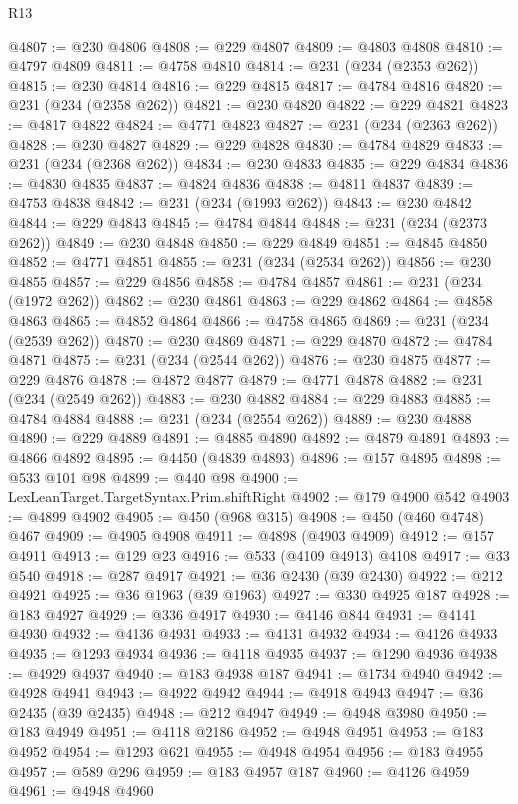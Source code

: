\begin{lexlean}{R13}
\begin{coremodule}
@4807 := @230 @4806
@4808 := @229 @4807
@4809 := @4803 @4808
@4810 := @4797 @4809
@4811 := @4758 @4810
@4814 := @231 (@234 (@2353 @262))
@4815 := @230 @4814
@4816 := @229 @4815
@4817 := @4784 @4816
@4820 := @231 (@234 (@2358 @262))
@4821 := @230 @4820
@4822 := @229 @4821
@4823 := @4817 @4822
@4824 := @4771 @4823
@4827 := @231 (@234 (@2363 @262))
@4828 := @230 @4827
@4829 := @229 @4828
@4830 := @4784 @4829
@4833 := @231 (@234 (@2368 @262))
@4834 := @230 @4833
@4835 := @229 @4834
@4836 := @4830 @4835
@4837 := @4824 @4836
@4838 := @4811 @4837
@4839 := @4753 @4838
@4842 := @231 (@234 (@1993 @262))
@4843 := @230 @4842
@4844 := @229 @4843
@4845 := @4784 @4844
@4848 := @231 (@234 (@2373 @262))
@4849 := @230 @4848
@4850 := @229 @4849
@4851 := @4845 @4850
@4852 := @4771 @4851
@4855 := @231 (@234 (@2534 @262))
@4856 := @230 @4855
@4857 := @229 @4856
@4858 := @4784 @4857
@4861 := @231 (@234 (@1972 @262))
@4862 := @230 @4861
@4863 := @229 @4862
@4864 := @4858 @4863
@4865 := @4852 @4864
@4866 := @4758 @4865
@4869 := @231 (@234 (@2539 @262))
@4870 := @230 @4869
@4871 := @229 @4870
@4872 := @4784 @4871
@4875 := @231 (@234 (@2544 @262))
@4876 := @230 @4875
@4877 := @229 @4876
@4878 := @4872 @4877
@4879 := @4771 @4878
@4882 := @231 (@234 (@2549 @262))
@4883 := @230 @4882
@4884 := @229 @4883
@4885 := @4784 @4884
@4888 := @231 (@234 (@2554 @262))
@4889 := @230 @4888
@4890 := @229 @4889
@4891 := @4885 @4890
@4892 := @4879 @4891
@4893 := @4866 @4892
@4895 := @4450 (@4839 @4893)
@4896 := @157 @4895
@4898 := @533 @101 @98
@4899 := @440 @98
@4900 := LexLeanTarget.TargetSyntax.Prim.shiftRight
@4902 := @179 @4900 @542
@4903 := @4899 @4902
@4905 := @450 (@968 @315)
@4908 := @450 (@460 @4748) @467
@4909 := @4905 @4908
@4911 := @4898 (@4903 @4909)
@4912 := @157 @4911
@4913 := @129 @23
@4916 := @533 (@4109 @4913) @4108
@4917 := @33 @540
@4918 := @287 @4917
@4921 := @36 @2430 (@39 @2430)
@4922 := @212 @4921
@4925 := @36 @1963 (@39 @1963)
@4927 := @330 @4925 @187
@4928 := @183 @4927
@4929 := @336 @4917
@4930 := @4146 @844
@4931 := @4141 @4930
@4932 := @4136 @4931
@4933 := @4131 @4932
@4934 := @4126 @4933
@4935 := @1293 @4934
@4936 := @4118 @4935
@4937 := @1290 @4936
@4938 := @4929 @4937
@4940 := @183 @4938 @187
@4941 := @1734 @4940
@4942 := @4928 @4941
@4943 := @4922 @4942
@4944 := @4918 @4943
@4947 := @36 @2435 (@39 @2435)
@4948 := @212 @4947
@4949 := @4948 @3980
@4950 := @183 @4949
@4951 := @4118 @2186
@4952 := @4948 @4951
@4953 := @183 @4952
@4954 := @1293 @621
@4955 := @4948 @4954
@4956 := @183 @4955
@4957 := @589 @296
@4959 := @183 @4957 @187
@4960 := @4126 @4959
@4961 := @4948 @4960

\end{coremodule}
\end{lexlean}
